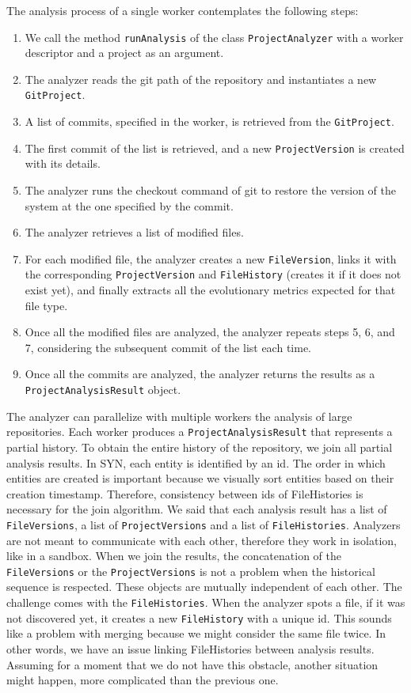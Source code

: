 The analysis process of a single worker contemplates the following steps:
\begin{enumerate}
    \item We call the method \texttt{runAnalysis} of the class \texttt{ProjectAnalyzer} with a worker descriptor and a project as an argument. 
    \item The analyzer reads the git path of the repository and instantiates a new \texttt{GitProject}. 
    \item A list of commits, specified in the worker, is retrieved from the \texttt{GitProject}.
    \item The first commit of the list is retrieved, and a new \texttt{ProjectVersion} is created with its details. 
    \item The analyzer runs the checkout command of git to restore the version of the system at the one specified by the commit. 
    \item The analyzer retrieves a list of modified files. 
    \item For each modified file, the analyzer creates a new \texttt{FileVersion}, links it with the corresponding  \texttt{ProjectVersion} and \texttt{FileHistory} (creates it if it does not exist yet), and finally extracts all the evolutionary metrics expected for that file type.
    \item Once all the modified files are analyzed, the analyzer repeats steps 5, 6, and 7, considering the subsequent commit of the list each time. 
    \item Once all the commits are analyzed, the analyzer returns the results as a \texttt{ProjectAnalysisResult} object. 
\end{enumerate}


The analyzer can parallelize with multiple workers the analysis of large repositories. Each worker produces a \texttt{ProjectAnalysisResult} that represents a partial history. To obtain the entire history of the repository, we join all partial analysis results. 
In SYN, each entity is identified by an id. 
The order in which entities are created is important because we visually sort entities based on their creation timestamp. 
Therefore, consistency between ids of FileHistories is necessary for the join algorithm.
We said that each analysis result has a list of \texttt{FileVersions}, a list of \texttt{ProjectVersions} and a list of \texttt{FileHistories}. 
Analyzers are not meant to communicate with each other, therefore they work in isolation, like in a sandbox. 
When we join the results, the concatenation of the \texttt{FileVersions} or the \texttt{ProjectVersions} is not a problem when the historical sequence is respected. 
These objects are mutually independent of each other.
The challenge comes with the \texttt{FileHistories}. When the analyzer spots a file, if it was not discovered yet, it creates a new \texttt{FileHistory} with a unique id. 
This sounds like a problem with merging because we might consider the same file twice. In other words, we have an issue linking FileHistories between analysis results.
Assuming for a moment that we do not have this obstacle, another situation might happen, more complicated than the previous one.
 
